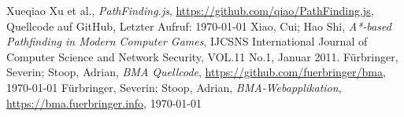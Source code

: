 \begin{thebibliography}{9}
  Xueqiao Xu et al.,
  \textit{PathFinding.js},
  \url{https://github.com/qiao/PathFinding.js},
  Quellcode auf GitHub,
  Letzter Aufruf: \today
{}
  Xiao, Cui; Hao Shi,
  \textit{A*-based Pathfinding in Modern Computer Games},
  IJCSNS International Journal of Computer Science and Network Security, VOL.11 No.1,
  Januar 2011.
  Fürbringer, Severin; Stoop, Adrian,
  \textit{BMA Quellcode},
  \url{https://github.com/fuerbringer/bma},
  \today
{}
  Fürbringer, Severin; Stoop, Adrian,
  \textit{BMA-Webapplikation},
  \url{https://bma.fuerbringer.info},
  \today
\end{thebibliography}
